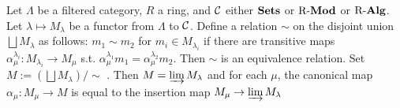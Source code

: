 \documentclass[11pt]{article}
\begin{document}
\begin{proposition}[]
\label{7.7}
Let \(\Lambda\) be a filtered category, \(R\) a ring, and \(\mathcal{C}\) either \(\operatorname{\textbf{Sets}}\) or
\(\operatorname{R-\textbf{Mod}}\) or \(\operatorname{R-\textbf{Alg}}\). Let \(\lambda\mapsto M_\lambda\) be a functor from \(\Lambda\)
to \(\mathcal{C}\). Define a relation \(\sim\) on the disjoint union
\(\bigsqcup M_\lambda\) as follows: \(m_1\sim m_2\) for \(m_i\in M_{\lambda_i}\) if there are
transitive maps \(\alpha_\mu^{\lambda_i}:M_{\lambda_i}\to M_\mu\) s.t.
\(\alpha_\mu^{\lambda_1}m_1=\alpha_\mu^{\lambda_2}m_2\). Then \(\sim\) is an
equivalence relation. Set \(M:=(\bigsqcup M_\lambda)/\sim\) . Then
\(M=\varinjlim M_\lambda\) and for each \(\mu\), the canonical map
\(\alpha_\mu:M_\mu\to M\) is equal to the insertion map \(M_\mu\to\varinjlim M_\lambda\)
\end{proposition}
\end{document}
